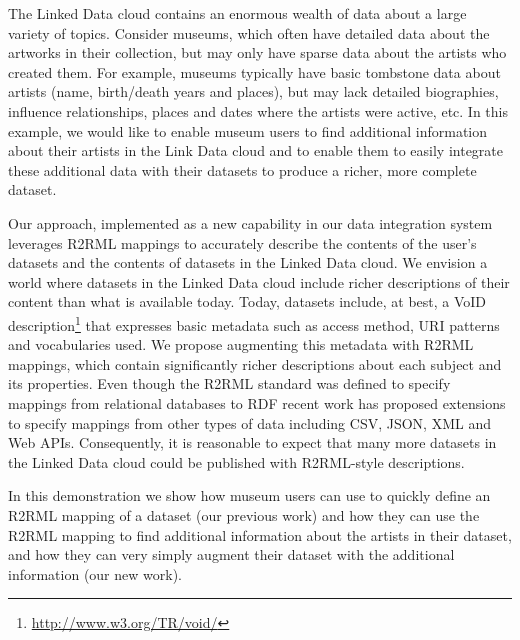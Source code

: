The Linked Data cloud contains an enormous wealth of data about a large variety of topics.
Consider museums, which often have detailed data about the artworks in their collection, but may only have sparse data about the artists who created them.
For example, museums typically have basic tombstone data about artists (name, birth/death years and places), but may lack detailed biographies, influence relationships, places and dates where the artists were active, etc.
In this example, we would like to enable museum users to find additional information about their artists in the Link Data cloud and to enable them to easily integrate these additional data with their datasets to produce a richer, more complete dataset.

Our approach, implemented as a new capability in our \karma data integration system~\cite{knoblock12:eswc} leverages R2RML mappings  to accurately describe the contents of the user's datasets and the contents of datasets in the Linked Data cloud.
We envision a world where datasets in the Linked Data cloud include richer descriptions of their content than what is available today.
Today, datasets include, at best, a VoID description\footnote{\url{http://www.w3.org/TR/void/}} that expresses basic metadata such as access method, URI patterns and vocabularies used.
We propose augmenting this metadata with R2RML mappings, which contain significantly richer descriptions about each subject and its properties.
Even though the R2RML standard was defined to specify mappings from relational databases to RDF recent work  has proposed extensions to specify mappings from other types of data including CSV, JSON, XML and Web APIs.
Consequently, it is reasonable to expect that many more datasets in the Linked Data cloud could be published with R2RML-style descriptions.

In this demonstration we show how museum users can use \karma to quickly define an R2RML mapping of a dataset (our previous work) and how they can use the R2RML mapping to find additional information about the artists in their dataset, and how they can very simply augment their dataset with the additional information (our new work).

